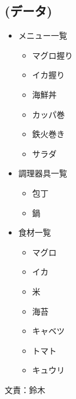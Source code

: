 \documentclass[a4j]{jsarticle} %
\begin{document}
\subsection*{(データ)}
\begin{itemize}
  \item メニュー一覧\par
    \begin{itemize}
      \item マグロ握り
      \item イカ握り
      \item 海鮮丼
      \item カッパ巻
      \item 鉄火巻き
      \item サラダ
    \end{itemize}
  \item 調理器具一覧\par
    \begin{itemize}
      \item 包丁
      \item 鍋
    \end{itemize}
  \item 食材一覧\par
    \begin{itemize}
      \item マグロ
      \item イカ
      \item 米
      \item 海苔
      \item キャベツ
      \item トマト
      \item キュウリ
    \end{itemize}     
\end{itemize}
文責：鈴木



\newpage
\end{document}
